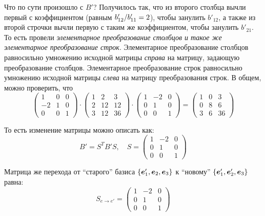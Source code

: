 \documentclass[a4paper,12pt]{article}
\begin{document}
\begin{example}
    Что по сути произошло с $B'$?
    Получилось так, что из второго столбца вычли первый с коэффициентом (равным $b'_{12} \hm/ b'_{11} \hm= 2$), чтобы занулить $b'_{12}$, а также из второй строчки вычли первую с таким же коэффициентом, чтобы занулить $b'_{21}$.
    То есть провели \emph{элементарное преобразование столбцов и такое же элементарное преобразование строк}.
    Элементарное преобразование столбцов равносильно умножению исходной матрицы \emph{справа} на матрицу, задающую преобразование столбцов.
    Элементарное преобразование строк равносильно умножению исходной матрицы \emph{слева} на матрицу преобразования строк.
    В общем, можно проверить, что
    \[
      \begin{pmatrix}
        1  & 0 & 0\\
        -2 & 1 & 0\\
        0  & 0 & 1
      \end{pmatrix} \cdot \begin{pmatrix}
        1 & 2  & 3\\
        2 & 12 & 12\\
        3 & 12  & 36
      \end{pmatrix} \cdot \begin{pmatrix}
        1 & -2 & 0\\
        0 & 1  & 0\\
        0 & 0  & 1
      \end{pmatrix} = \begin{pmatrix}
        1 & 0 & 3\\
        0 & 8 & 6\\
        3 & 6 & 36
      \end{pmatrix}
    \]
    
    То есть изменение матрицы можно описать как: %
    \[
      B' = S^T B' S,\quad S = \begin{pmatrix}
        1 & -2 & 0\\
        0 & 1  & 0\\
        0 & 0  & 1
      \end{pmatrix}
    \]
    
    Матрица же перехода от ``старого'' базиса $\{\boldsymbol e_1', \boldsymbol e_2, \boldsymbol e_3\}$ к ``новому'' $\{\boldsymbol e_1', \boldsymbol e_2', \boldsymbol e_3\}$ равна:
    \[
      S_{e \to e'} = \begin{pmatrix}
        1 & -2 & 0\\
        0 & 1  & 0\\
        0 & 0  & 1
      \end{pmatrix}
    \]
    

\end{example}
\end{document}

